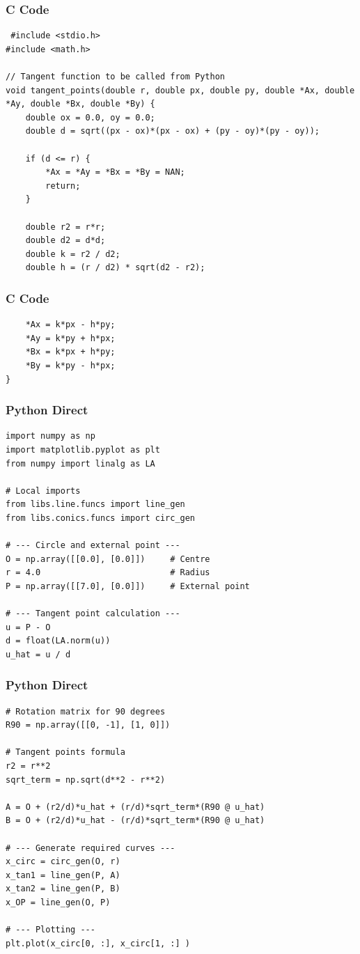 \documentclass{beamer}
\begin{document}
\begin{frame}[fragile]
\frametitle{C Code}
\begin{lstlisting}
 #include <stdio.h>
#include <math.h>

// Tangent function to be called from Python
void tangent_points(double r, double px, double py, double *Ax, double *Ay, double *Bx, double *By) {
    double ox = 0.0, oy = 0.0;
    double d = sqrt((px - ox)*(px - ox) + (py - oy)*(py - oy));

    if (d <= r) {
        *Ax = *Ay = *Bx = *By = NAN;
        return;
    }

    double r2 = r*r;
    double d2 = d*d;
    double k = r2 / d2;
    double h = (r / d2) * sqrt(d2 - r2);
    \end{lstlisting}
\end{frame}
\begin{frame}[fragile]
\frametitle{C Code}
\begin{lstlisting}
    *Ax = k*px - h*py;
    *Ay = k*py + h*px;
    *Bx = k*px + h*py;
    *By = k*py - h*px;
}

\end{lstlisting}
    
\end{frame}
\begin{frame}[fragile]
\frametitle{Python Direct}
\begin{lstlisting}
import numpy as np
import matplotlib.pyplot as plt
from numpy import linalg as LA

# Local imports
from libs.line.funcs import line_gen
from libs.conics.funcs import circ_gen

# --- Circle and external point ---
O = np.array([[0.0], [0.0]])     # Centre
r = 4.0                          # Radius
P = np.array([[7.0], [0.0]])     # External point

# --- Tangent point calculation ---
u = P - O
d = float(LA.norm(u))
u_hat = u / d
\end{lstlisting}
    
\end{frame}
\begin{frame}[fragile]
\frametitle{Python Direct}
\begin{lstlisting}
# Rotation matrix for 90 degrees
R90 = np.array([[0, -1], [1, 0]])

# Tangent points formula
r2 = r**2
sqrt_term = np.sqrt(d**2 - r**2)

A = O + (r2/d)*u_hat + (r/d)*sqrt_term*(R90 @ u_hat)
B = O + (r2/d)*u_hat - (r/d)*sqrt_term*(R90 @ u_hat)

# --- Generate required curves ---
x_circ = circ_gen(O, r)
x_tan1 = line_gen(P, A)
x_tan2 = line_gen(P, B)
x_OP = line_gen(O, P)

# --- Plotting ---
plt.plot(x_circ[0, :], x_circ[1, :] )
\end{lstlisting}
    
\end{frame}
\end{document}
